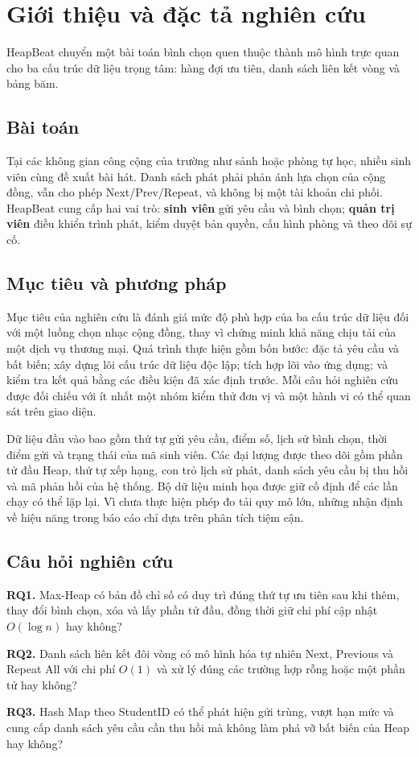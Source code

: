 \documentclass[12pt,a4paper,twoside,openright]{report}
\newcommand{\pagelead}[1]{\noindent\textcolor{hbmuted}{\small #1}}
\newcommand{\researchq}[2]{%
  \noindent\textbf{#1.} #2\par\smallskip}
\begin{document}
\cleardoublepage
{}
\setcounter{page}{1}

\chapter{Giới thiệu và đặc tả nghiên cứu}
\pagelead{HeapBeat chuyển một bài toán bình chọn quen thuộc thành mô hình trực quan cho ba
cấu trúc dữ liệu trọng tâm: hàng đợi ưu tiên, danh sách liên kết vòng và bảng băm.}

\section{Bài toán}
Tại các không gian công cộng của trường như sảnh hoặc phòng tự học, nhiều sinh viên cùng
đề xuất bài hát. Danh sách phát phải phản ánh lựa
chọn của cộng đồng, vẫn cho phép Next/Prev/Repeat, và không bị một tài khoản chi phối.
HeapBeat cung cấp hai vai trò: \textbf{sinh viên} gửi yêu cầu và bình chọn; \textbf{quản trị viên}
điều khiển trình phát, kiểm duyệt bản quyền, cấu hình phòng và theo dõi sự cố.

\section{Mục tiêu và phương pháp}
Mục tiêu của nghiên cứu là đánh giá mức độ phù hợp của ba cấu trúc dữ liệu đối với một
luồng chọn nhạc cộng đồng, thay vì chứng minh khả năng chịu tải của một dịch vụ thương mại.
Quá trình thực hiện gồm bốn bước: đặc tả yêu cầu và bất biến; xây dựng lõi cấu trúc dữ liệu
độc lập; tích hợp lõi vào ứng dụng; và kiểm tra kết quả bằng các điều kiện đã xác định trước.
Mỗi câu hỏi nghiên cứu được đối chiếu với ít nhất một nhóm kiểm thử đơn vị và một hành vi
có thể quan sát trên giao diện.

Dữ liệu đầu vào bao gồm thứ tự gửi yêu cầu, điểm số, lịch sử bình chọn, thời điểm gửi và
trạng thái của mã sinh viên. Các đại lượng được theo dõi gồm phần tử đầu Heap, thứ tự xếp
hạng, con trỏ lịch sử phát, danh sách yêu cầu bị thu hồi và mã phản hồi của hệ thống. Bộ
dữ liệu minh họa được giữ cố định để các lần chạy có thể lặp lại. Vì chưa thực hiện phép
đo tải quy mô lớn, những nhận định về hiệu năng trong báo cáo chỉ dựa trên phân tích tiệm cận.

\section{Câu hỏi nghiên cứu}
\researchq{RQ1}{Max-Heap có bản đồ chỉ số có duy trì đúng thứ tự ưu tiên sau khi thêm,
thay đổi bình chọn, xóa và lấy phần tử đầu, đồng thời giữ chi phí cập nhật $O(\log n)$ hay không?}
\researchq{RQ2}{Danh sách liên kết đôi vòng có mô hình hóa tự nhiên Next, Previous và Repeat All
với chi phí $O(1)$ và xử lý đúng các trường hợp rỗng hoặc một phần tử hay không?}
\researchq{RQ3}{Hash Map theo StudentID có thể phát hiện gửi trùng, vượt hạn mức và cung cấp
danh sách yêu cầu cần thu hồi mà không làm phá vỡ bất biến của Heap hay không?}
\end{document}
